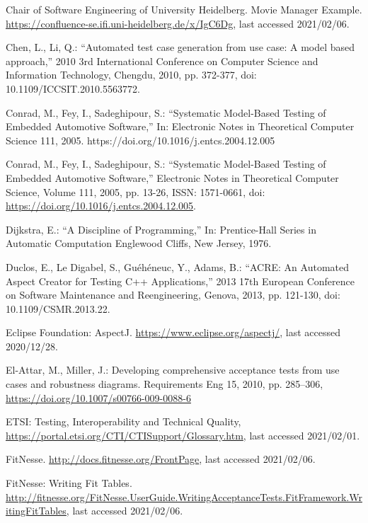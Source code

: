 \documentclass[a4paper,10pt, bibliography=totocnumbered]{scrreprt}
\begin{document}
\begin{thebibliography}{9}
 Chair of Software Engineering of University Heidelberg. Movie Manager Example. 
\url{https://confluence-se.ifi.uni-heidelberg.de/x/IgC6Dg}, last accessed 2021/02/06. 

 Chen, L., Li, Q.: \enquote{Automated test case generation from use case: A model based approach,} 2010 3rd International Conference on Computer Science and Information Technology, Chengdu, 2010, pp. 372-377, doi: 10.1109/ICCSIT.2010.5563772.

 Conrad, M., Fey, I., Sadeghipour, S.: \enquote{Systematic Model-Based Testing of Embedded Automotive Software,} 
In: Electronic Notes in Theoretical Computer Science 111, 2005.
https://doi.org/10.1016/j.entcs.2004.12.005


Conrad, M., Fey, I., Sadeghipour, S.: \enquote{Systematic Model-Based Testing of Embedded
Automotive Software,} Electronic Notes in Theoretical Computer Science, Volume 111, 2005, pp. 13-26, ISSN: 1571-0661, doi: \url{https://doi.org/10.1016/j.entcs.2004.12.005}.

 Dijkstra, E.: \enquote{A Discipline of Programming,}
In: Prentice-Hall Series in Automatic Computation Englewood Cliffs, New Jersey, 1976.

 Duclos, E., Le Digabel, S., Guéhéneuc, Y.,  Adams, B.: \enquote{ACRE: An Automated Aspect Creator for Testing C++ Applications,} 2013 17th European Conference on Software Maintenance and Reengineering, Genova, 2013, pp. 121-130, doi: 10.1109/CSMR.2013.22.

 Eclipse Foundation: AspectJ.
\url{https://www.eclipse.org/aspectj/},  last accessed 2020/12/28.

 El-Attar, M., Miller, J.: Developing comprehensive acceptance tests from use cases and robustness diagrams. Requirements Eng 15, 2010, pp. 285–306, \url{https://doi.org/10.1007/s00766-009-0088-6}

 ETSI: Testing, Interoperability and Technical Quality, \url{https://portal.etsi.org/CTI/CTISupport/Glossary.htm}, last accessed 2021/02/01.

 FitNesse. \url{http://docs.fitnesse.org/FrontPage}, last accessed 2021/02/06.

 FitNesse: Writing Fit Tables. \url{http://fitnesse.org/FitNesse.UserGuide.WritingAcceptanceTests.FitFramework.WritingFitTables}, last accessed 2021/02/06.


\end{thebibliography}
\end{document}

